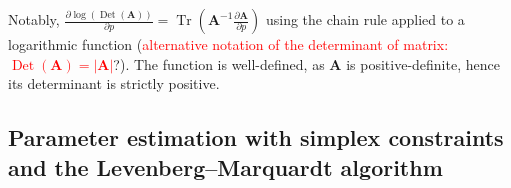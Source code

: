 \documentclass[long, final]{jobim}
\DeclareMathOperator*{\Tr}{Tr}
\DeclareMathOperator*{\DET}{Det}
\begin{document}
Notably, $\frac{\partial \log\left(\DET(\boldsymbol{A})\right)}{\partial p}= \Tr \left(\boldsymbol{A}^{-1} \frac{\partial \boldsymbol{A}}{\partial p} \right)$ using the chain rule applied to a logarithmic function (\textcolor{red}{alternative notation of the determinant of matrix: $\DET(\boldsymbol{A})=|\boldsymbol{A}|$}?). The function is well-defined, as $\boldsymbol{A}$ is positive-definite, hence its determinant is strictly positive. 



\subsection{Parameter estimation with simplex constraints and the Levenberg–Marquardt algorithm}
\label{subsec:Levenberg–Marquardt}




    
    
\end{document}
